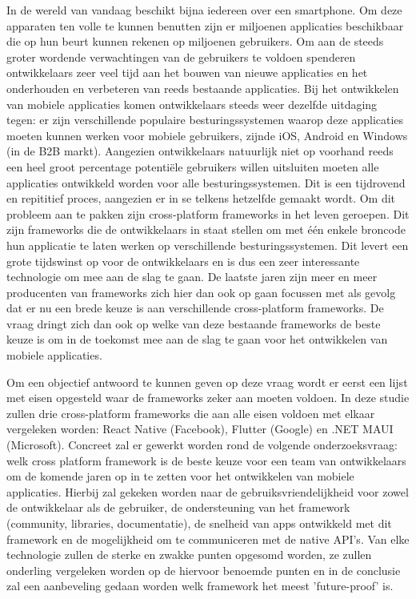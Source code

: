In de wereld van vandaag beschikt bijna iedereen over een smartphone. Om deze apparaten ten volle te kunnen benutten zijn er miljoenen applicaties beschikbaar die op hun beurt kunnen rekenen op miljoenen gebruikers. Om aan de steeds groter wordende verwachtingen van de gebruikers te voldoen spenderen ontwikkelaars zeer veel tijd aan het bouwen van nieuwe applicaties en het onderhouden en verbeteren van reeds bestaande applicaties. Bij het ontwikkelen van mobiele applicaties komen ontwikkelaars steeds weer dezelfde uitdaging tegen: er zijn verschillende populaire besturingssystemen waarop deze applicaties moeten kunnen werken voor mobiele gebruikers, zijnde iOS, Android en Windows (in de B2B markt). Aangezien ontwikkelaars natuurlijk niet op voorhand reeds een heel groot percentage potentiële gebruikers willen uitsluiten moeten alle applicaties ontwikkeld worden voor alle besturingssystemen. Dit is een tijdrovend en repititief proces, aangezien er in se telkens hetzelfde gemaakt wordt. Om dit probleem aan te pakken zijn cross-platform frameworks in het leven geroepen. Dit zijn frameworks die de ontwikkelaars in staat stellen om met één enkele broncode hun applicatie te laten werken op verschillende besturingssystemen. Dit levert een grote tijdswinst op voor de ontwikkelaars en is dus een zeer interessante technologie om mee aan de slag te gaan. De laatste jaren zijn meer en meer producenten van frameworks zich hier dan ook op gaan focussen met als gevolg dat er nu een brede keuze is aan verschillende cross-platform frameworks. De vraag dringt zich dan ook op welke van deze bestaande frameworks de beste keuze is om in de toekomst mee aan de slag te gaan voor het ontwikkelen van mobiele applicaties.

Om een objectief antwoord te kunnen geven op deze vraag wordt er eerst een lijst met eisen opgesteld waar de frameworks zeker aan moeten voldoen. In deze studie zullen drie cross-platform frameworks die aan alle eisen voldoen met elkaar vergeleken worden: React Native (Facebook), Flutter (Google) en .NET MAUI (Microsoft). Concreet zal er gewerkt worden rond de volgende onderzoeksvraag: welk cross platform framework is de beste keuze voor een team van ontwikkelaars om de komende jaren op in te zetten voor het ontwikkelen van mobiele applicaties. Hierbij zal gekeken worden naar de gebruiksvriendelijkheid voor zowel de ontwikkelaar als de gebruiker, de ondersteuning van het framework (community, libraries, documentatie), de snelheid van apps ontwikkeld met dit framework en de mogelijkheid om te communiceren met de native API's. Van elke technologie zullen de sterke en zwakke punten opgesomd worden, ze zullen onderling vergeleken worden op de hiervoor benoemde punten en in de conclusie zal een aanbeveling gedaan worden welk framework het meest 'future-proof' is. 




%